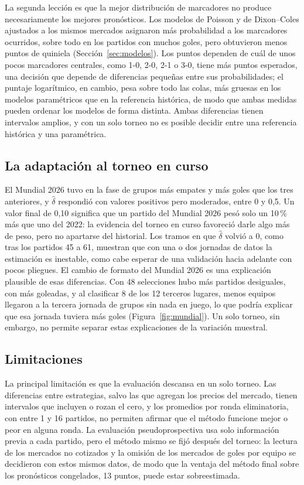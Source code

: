\documentclass[12pt]{article}
\theoremstyle{plain}
\theoremstyle{remark}
\begin{document}
La segunda lección es que la mejor distribución de marcadores no
produce necesariamente los mejores pronósticos.
Los modelos de Poisson y de Dixon--Coles ajustados a los mismos
mercados asignaron más probabilidad a los marcadores ocurridos, sobre
todo en los partidos con muchos goles, pero obtuvieron menos puntos de
quiniela (Sección~\ref{sec:modelos}).
Los puntos dependen de cuál de unos pocos marcadores centrales, como
1-0, 2-0, 2-1 o 3-0, tiene más puntos esperados, una decisión que
depende de diferencias pequeñas entre sus probabilidades; el puntaje
logarítmico, en cambio, pesa sobre todo las colas, más gruesas en los
modelos paramétricos que en la referencia histórica, de modo que
ambas medidas pueden ordenar los modelos de forma distinta.
Ambas diferencias tienen intervalos amplios, y con un solo torneo no
es posible decidir entre una referencia histórica y una paramétrica.

\subsection{La adaptación al torneo en curso}

El Mundial 2026 tuvo en la fase de grupos más empates y más goles que
los tres anteriores, y $\hat\delta$ respondió con valores positivos pero
moderados, entre 0 y 0,5.
Un valor final de 0,10 significa que un partido del Mundial 2026 pesó
solo un 10\,\% más que uno del 2022: la evidencia del torneo en curso
favoreció darle algo más de peso, pero no apartarse del historial.
Los tramos en que $\hat\delta$ volvió a 0, como tras los partidos 45 a
61, muestran que con una o dos jornadas de datos la estimación es
inestable, como cabe esperar de una validación hacia adelante con
pocos pliegues.
El cambio de formato del Mundial 2026 es una explicación plausible de
esas diferencias.
Con 48 selecciones hubo más partidos desiguales, con más goleadas, y
al clasificar 8 de los 12 terceros lugares, menos equipos llegaron a
la tercera jornada de grupos sin nada en juego, lo que podría explicar
que esa jornada tuviera más goles (Figura~\ref{fig:mundial}).
Un solo torneo, sin embargo, no permite separar estas explicaciones de
la variación muestral.

\subsection{Limitaciones}

La principal limitación es que la evaluación descansa en un solo
torneo.
Las diferencias entre estrategias, salvo las que agregan los precios
del mercado, tienen intervalos que incluyen o rozan el cero, y los
promedios por ronda eliminatoria, con entre 1 y 16 partidos, no
permiten afirmar que el método funcione mejor o peor en alguna ronda.
La evaluación pseudoprospectiva usa solo información previa a cada
partido, pero el método mismo se fijó después del torneo: la lectura
de los mercados no cotizados y la omisión de los mercados de goles
por equipo se decidieron con estos mismos datos, de modo que la
ventaja del método final sobre los pronósticos congelados, 13 puntos,
puede estar sobreestimada.
\end{document}
